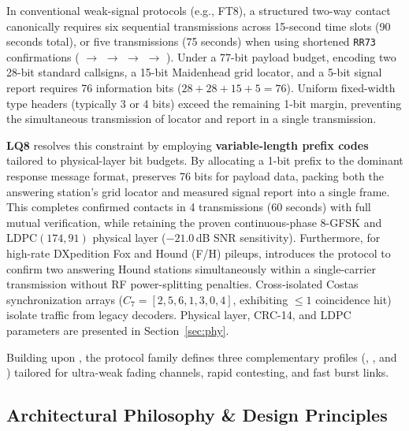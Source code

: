 In conventional weak-signal protocols (e.g., FT8), a structured two-way contact canonically requires six sequential transmissions across 15-second time slots (90 seconds total), or five transmissions (75 seconds) when using shortened \texttt{RR73} confirmations ( $\to$  $\to$  $\to$  $\to$ ). Under a 77-bit payload budget, encoding two 28-bit standard callsigns, a 15-bit Maidenhead grid locator, and a 5-bit signal report requires 76 information bits ($28+28+15+5=76$). Uniform fixed-width type headers (typically 3 or 4 bits) exceed the remaining 1-bit margin, preventing the simultaneous transmission of locator and report in a single transmission.

\textbf{LQ8} resolves this constraint by employing \textbf{variable-length prefix codes}~\cite{huffman} tailored to physical-layer bit budgets. By allocating a 1-bit prefix to the dominant response message format,  preserves 76 bits for payload data, packing both the answering station's grid locator and measured signal report into a single frame. This completes confirmed contacts in 4 transmissions (60 seconds) with full mutual verification, while retaining the proven continuous-phase 8-GFSK and LDPC$(174,91)$ physical layer ($-21.0$\,dB SNR sensitivity). Furthermore, for high-rate DXpedition Fox and Hound (F/H) pileups,  introduces the  protocol to confirm two answering Hound stations simultaneously within a single-carrier transmission without RF power-splitting penalties. Cross-isolated Costas synchronization arrays ($C_7 = [2, 5, 6, 1, 3, 0, 4]$, exhibiting $\le 1$ coincidence hit) isolate traffic from legacy decoders. Physical layer, CRC-14, and LDPC parameters are presented in Section~\ref{sec:phy}.

Building upon , the protocol family defines three complementary profiles (, , and ) tailored for ultra-weak fading channels, rapid contesting, and fast burst links.

\subsection{Architectural Philosophy \& Design Principles}
\label{sec:advantages}

